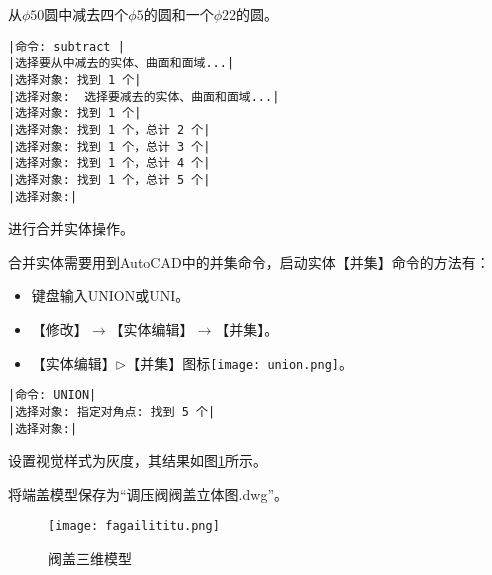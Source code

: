 \begin{procedure}
从$\phi 50$圆中减去四个$\phi 5$的圆和一个$\phi 22$的圆。
\begin{lstlisting}
|命令: subtract |
|选择要从中减去的实体、曲面和面域...|
|选择对象: 找到 1 个|
|选择对象:  选择要减去的实体、曲面和面域...|
|选择对象: 找到 1 个|
|选择对象: 找到 1 个，总计 2 个|
|选择对象: 找到 1 个，总计 3 个|
|选择对象: 找到 1 个，总计 4 个|
|选择对象: 找到 1 个，总计 5 个|
|选择对象:|
\end{lstlisting}
\item 进行合并实体操作。

合并实体需要用到AutoCAD中的并集命令，启动实体【并集】命令的方法有：
\begin{itemize}
\item 键盘输入UNION或UNI。
\item 【修改】$\rightarrow$【实体编辑】$\rightarrow$【并集】。
\item 【实体编辑】$\triangleright$【并集】图标\texttt{[image: union.png]}。
\end{itemize}
\begin{lstlisting}
|命令: UNION|
|选择对象: 指定对角点: 找到 5 个|
|选择对象:|
\end{lstlisting}
\item 设置视觉样式为灰度，其结果如图\ref{fig:fagailititu}所示。
\item 将端盖模型保存为“调压阀阀盖立体图.dwg”。
\end{procedure}
\begin{figure}[htbp]
\texttt{[image: fagailititu.png]}
\caption{阀盖三维模型}\label{fig:fagailititu}
\end{figure}
\endinput